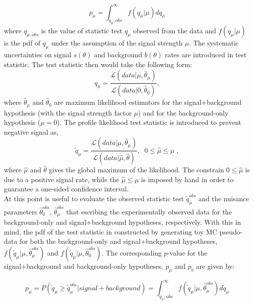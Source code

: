 \begin{equation}
  p_{\mu}=  \int_{ q_{\mu},obs }^{\infty } f(q_{\mu}| \mu  ) dq_{\mu}   \end{equation}
where $ q_{\mu,obs} $ is the value of statistic test $q_{\mu}$ observed from the data and $f(q_{\mu}| \mu  )$ is the pdf of $q_{\mu}$ under the assumption of the signal strength $\mu$.
\newline
The systematic uncertainties on signal $s(\theta)$ and background $b(\theta)$ rates are introduced in test statistic.
The test statistic then would take the following form:
\begin{equation}
 q_{\mu} =\frac{\mathcal{L}(data | \mu, \hat{\theta}_{\mu} )  }{ \mathcal{L}(data |0, \hat{\theta}_0 )},  \end{equation}
where $\hat{\theta}_{\mu}$ and $\hat{\theta}_0$ are maximum likelihood estimators for the signal+background
hypothesis (with the signal strength factor $\mu$) and for the
background-only hypothesis ($\mu =0$). 
The profile likelihood test statistic is introduced to prevent negative signal as,
\begin{equation}
 \tilde{q}_{\mu} =\frac{\mathcal{L}(data | \mu, \hat{\theta}_{\mu} )  }{ \mathcal{L}(data |\hat{\mu}, \hat{\theta} )}, \; \; 0 \leq \hat{\mu} \leq \mu \; ,  \end{equation}
where $\hat{\mu}$ and $\hat{\theta}$ gives the global maximum of the likelihood. 
The constrain  $0 \leq \hat{\mu}$ is due to a positive signal rate, while the   $\hat{\mu} \leq \mu$ is imposed by hand in order to guarantee a one-sided  confidence interval.\\
At this point is useful to evaluate the observed statistic test $\tilde{q}_{\mu}^{obs}$ and the nuisance parameters $\hat{\theta}_0^{obs}$, $\hat{\theta}_{\mu}^{obs}$ that escribing  the  experimentally observed data for the background-only and signal+background hypotheses, respectively.
With this in mind, the pdf of the test statistic in constructed by generating toy MC pseudo-data for both the background-only and signal+background hypotheses, 
$f(\tilde{q}_{\mu}| \mu, \hat{\theta}_{\mu}^{obs}  )$ and $f(\tilde{q}_{\mu}| \mu, \hat{\theta}_{0}^{obs}  )$. The corresponding $p$-value for the
signal+background and background-only hypotheses, $p_{\mu}$ and $p_b$ are given by:


\begin{equation}
  p_{\mu}= P( \tilde{q}_{\mu} \geq \tilde{q}_{\mu}^{obs} | signal+background)=  \int_{ q_{\mu},obs }^{\infty } f(\tilde{q}_{\mu}| \mu, \hat{\theta}_{\mu}^{obs}   ) d \tilde{q}_{\mu}   \end{equation}


